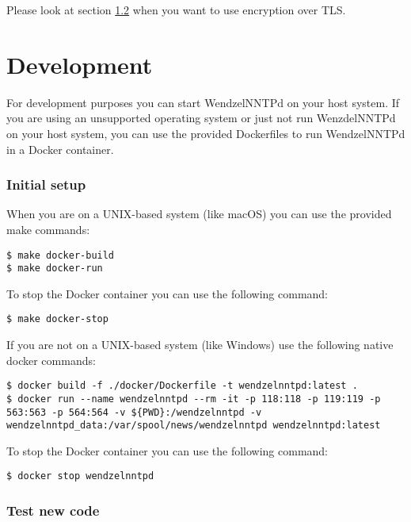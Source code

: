 \documentclass[12pt,fleqn,leqno]{scrbook}
\begin{document}
Please look at section \protect\hyperlink{network-settings}{1.2} when
you want to use encryption over TLS.

\hypertarget{development}{%
\section{Development}\label{development}}

For development purposes you can start WendzelNNTPd on your host system.
If you are using an unsupported operating system or just not run
WenzdelNNTPd on your host system, you can use the provided Dockerfiles
to run WendzelNNTPd in a Docker container.

\hypertarget{initial-setup}{%
\subsubsection{Initial setup}\label{initial-setup}}

When you are on a UNIX-based system (like macOS) you can use the
provided make commands:

\begin{verbatim}
$ make docker-build
$ make docker-run
\end{verbatim}

To stop the Docker container you can use the following command:

\begin{verbatim}
$ make docker-stop
\end{verbatim}

If you are not on a UNIX-based system (like Windows) use the following
native docker commands:

\begin{verbatim}
$ docker build -f ./docker/Dockerfile -t wendzelnntpd:latest .
$ docker run --name wendzelnntpd --rm -it -p 118:118 -p 119:119 -p 563:563 -p 564:564 -v ${PWD}:/wendzelnntpd -v wendzelnntpd_data:/var/spool/news/wendzelnntpd wendzelnntpd:latest
\end{verbatim}

To stop the Docker container you can use the following command:

\begin{verbatim}
$ docker stop wendzelnntpd
\end{verbatim}

\hypertarget{test-new-code}{%
\subsubsection{Test new code}\label{test-new-code}}
\end{document}
